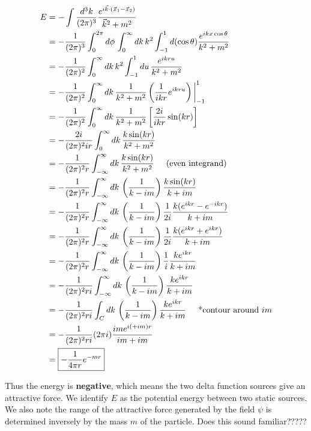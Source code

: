 \documentclass{book}
\theoremstyle{definition}
\newcommand{\f}[2]{\frac{#1}{#2}}
\newcommand{\lp}{\left(}
\newcommand{\rp}{\right)}
\newcommand{\lb}{\left[}
\newcommand{\rb}{\right]}
\begin{document}
\begin{align}
E &= -\int \f{d^3k}{(2\pi)^3}\f{e^{i\vec{k}\cdot(\vec{x}_1 - \vec{x}_2)}}{\vec{k}^2 + m^2} \nonumber\\
&= -\f{1}{(2\pi)^3}\int_0^{2\pi}d\phi\,\int^\infty_0 dk\,k^2 \int^{1}_{-1}d(\cos\theta)\f{e^{ikx\cos\theta}}{k^2 + m^2} \nonumber\\
&= -\f{1}{(2\pi)^2}\int^\infty_0 dk\,k^2 \int^{1}_{-1}du\,\f{e^{ikru}}{k^2 + m^2} \nonumber\\
&= -\f{1}{(2\pi)^2} \int^\infty_0 dk\,\f{1}{k^2 + m^2} \lp \f{1}{ikr}e^{ikru} \rp\bigg\vert^1_{-1}\nonumber\\
&= -\f{1}{(2\pi)^2} \int^\infty_0 dk\,\f{1}{k^2 + m^2} \lb \f{2i}{ikr}\sin(kr)\rb\nonumber\\
&= -\f{2i}{(2\pi)^2ir} \int^\infty_0 dk\,\f{k\sin (kr)}{k^2 + m^2}\nonumber\\
&= -\f{1}{(2\pi)^2r} \int^\infty_{-\infty}dk\,\f{k\sin (kr)}{k^2 + m^2} \hspace{0.5cm} \text{(even integrand)}\nonumber\\
&= -\f{1}{(2\pi)^2r} \int^\infty_{-\infty}dk\,\lp\f{1}{k - im}\rp\f{k\sin(kr)}{k + im}\nonumber\\
&= -\f{1}{(2\pi)^2r}\int^\infty_{-\infty}dk\,\lp\f{1}{k - im}\rp\f{1}{2i}\f{k(e^{ikr} - e^{-ikr})}{k + im} \nonumber\\
&= -\f{1}{(2\pi)^2r}\int^\infty_{-\infty}dk\,\lp\f{1}{k - im}\rp\f{1}{2i}\f{k(e^{ikr} + e^{ikr})}{k + im}\nonumber\\
&=  -\f{1}{(2\pi)^2r}\int^\infty_{-\infty}dk\,\lp\f{1}{k - im}\rp\f{1}{i}\f{k e^{ikr}}{k + im}\nonumber\\
&= -\f{1}{(2\pi)^2ri}\int^\infty_{-\infty}dk\,\lp\f{1}{k - im}\rp\f{k e^{ikr}}{k + im}\nonumber \\
&= -\f{1}{(2\pi)^2ri}\int_{C}dk\,\lp\f{1}{k - im}\rp\f{k e^{ikr}}{k + im} \hspace{0.5cm} \text{*contour around } im \nonumber\\
&= -\f{1}{(2\pi)^2ri}(2\pi i)\f{im e^{i(+im)r}}{im + im} \nonumber\\
&= \boxed{-\f{1}{4\pi r}e^{-mr}}
\end{align}

Thus the energy is \textbf{negative}, which means the two delta function sources give an attractive force. We identify $E$ as the potential energy between two static sources. We also note the range of the attractive force generated by the field $\psi$ is determined inversely by the mass $m$ of the particle. Does this sound familiar?????
\end{document}
